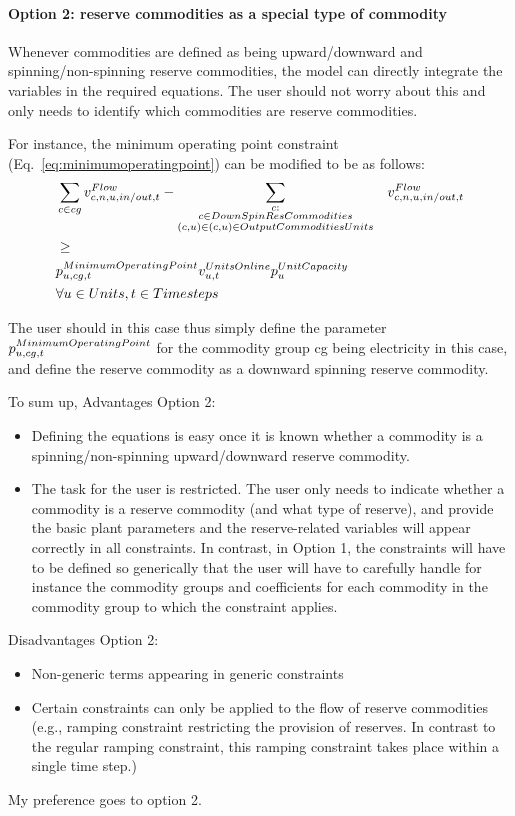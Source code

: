\paragraph{Option 2: reserve commodities as a special type of commodity}
Whenever commodities are defined as being upward/downward and spinning/non-spinning reserve commodities, the model can directly integrate the variables in the required equations. The user should not worry about this and only needs to identify which commodities are reserve commodities. 

For instance, the minimum operating point constraint (Eq.~\eqref{eq:minimumoperatingpoint}) can be modified to be as follows:
\begin{align}
&\sum_{c \in cg} v^{Flow}_{c,n, u,in/out,t} - \sum_{\substack{c :  \\
													c \in DownSpinResCommodities \\
													(c,u) \in (c, u) \in OutputCommoditiesUnits}}
										&v^{Flow}_{c,n, u,in/out,t} \nonumber \\
										&\ge \nonumber \\
& p^{MinimumOperatingPoint}_{u,cg,t} v^{UnitsOnline}_{u,t} p^{UnitCapacity}_{u} \nonumber \\
& \forall u \in Units, t \in Timesteps
\end{align}

The user should in this case thus simply define the parameter $p^{MinimumOperatingPoint}_{u,cg,t}$ for the commodity group cg being electricity in this case, and define the reserve commodity as a downward spinning reserve commodity.

To sum up,
Advantages Option 2:
\begin{itemize}
\item Defining the equations is easy once it is known whether a commodity is a spinning/non-spinning upward/downward reserve commodity.
\item The task for the user is restricted. The user only needs to indicate whether a commodity is a reserve commodity (and what type of reserve), and provide the basic plant parameters and the reserve-related variables will appear correctly in all constraints. In contrast, in Option 1, the constraints will have to be defined so generically that the user will have to carefully handle for instance the commodity groups and coefficients for each commodity in the commodity group to which the constraint applies.
\end{itemize}
Disadvantages Option 2:
\begin{itemize}
\item Non-generic terms appearing in generic constraints
\item Certain constraints can only be applied to the flow of reserve commodities (e.g., ramping constraint restricting the provision of reserves. In contrast to the regular ramping constraint, this ramping constraint takes place within a single time step.)
\end{itemize}

My preference goes to option 2.
